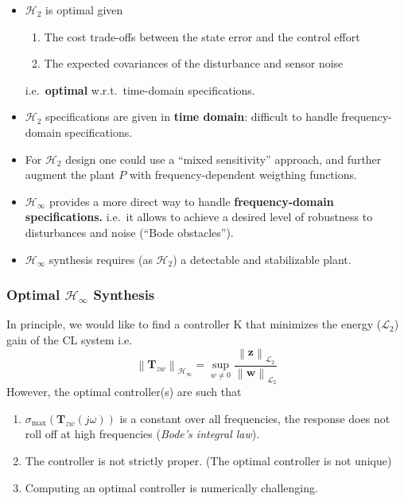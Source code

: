 \begin{itemize}
    \item $\mathcal{H}_2$ is optimal given
          \begin{enumerate}
              \item The cost trade-offs between the state error and the control effort
              \item The expected covariances of the disturbance and sensor noise
          \end{enumerate} i.e.\ \textbf{optimal} w.r.t.\ time-domain specifications.
    \item $\mathcal{H}_2$ specifications are given in \textbf{time domain}: difficult to handle frequency-domain specifications.
    \item For $\mathcal{H}_2$ design one could use a ``mixed sensitivity'' approach, and further augment the plant $P$ with frequency-dependent weigthing functions.
    \item $\mathcal{H}_\infty$ provides a more direct way to handle \textbf{frequency-domain specifications.} i.e.\ it allows to achieve a desired level of robustness to disturbances and noise (``Bode obstacles'').
\end{itemize}

\newpar{}
\begin{itemize}
    \item $\mathcal{H}_\infty$ synthesis requires (as $\mathcal{H}_2$) a detectable and stabilizable plant.
\end{itemize}

\subsubsection[Optimal H-infinity Synthesis]{Optimal $\mathcal{H}_\infty$ Synthesis}
In principle, we would like to find a controller K that minimizes the energy ($\mathcal{L}_2$) gain of the CL system i.e.
\begin{equation*}
    \left\|\mathbf{T}_{zw}\right\|_{\mathcal{H}_\infty}=\sup_{w\neq0}\frac{\left\|\mathbf{z}\right\|_{\mathcal{L}_2}}{\left\|\mathbf{w}\right\|_{\mathcal{L}_2}}
\end{equation*}
However, the optimal controller(s) are such that
\begin{enumerate}
    \item $\sigma_{\max}(\mathbf{T}_{zw}(j\omega))$ is a constant over all frequencies, the response does not roll off at high frequencies (\textit{Bode's integral law}).
    \item The controller is not strictly proper. (The optimal controller is not unique)
    \item Computing an optimal controller is numerically challenging.
\end{enumerate}


